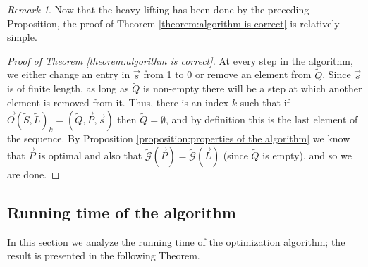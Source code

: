 \documentclass{amsbook}
\theoremstyle{plain}
\theoremstyle{definition}
\theoremstyle{remark}
\newtheorem{remark}{Remark}
\newcommand{\lst}{\vec}
\newcommand{\set}{\tilde}
\newcommand{\genfun}{\tilde{\mathcal{G}}}
\begin{document}
\begin{remark}
Now that the heavy lifting has been done by the preceding Proposition, the proof of Theorem \ref{theorem:algorithm is correct} is relatively simple.
\end{remark}

\begin{proof}[Proof of Theorem \ref{theorem:algorithm is correct}]
At every step in the algorithm, we either change an entry in $\lst s$ from 1 to 0 or remove an element from $\set Q$.  Since $\lst s$ is of finite length, as long as $\set Q$ is non-empty there will be a step at which another element is removed from it.  Thus, there is an index $k$ such that if $\lst O(\set S,\set L)_k=(\set Q,\lst P,\lst s)$ then $\set Q=\emptyset$, and by definition this is the last element of the sequence.  By Proposition \ref{proposition:properties of the algorithm} we know that $\lst P$ is optimal and also that $\genfun(\lst P)=\genfun(\lst L)$ (since $\set Q$ is empty), and so we are done.
\end{proof}
\subsection{Running time of the algorithm}

\label{subsubsection:running time analysis}

In this section we analyze the running time of the optimization algorithm;  the result is presented in the following Theorem.
\end{document}
